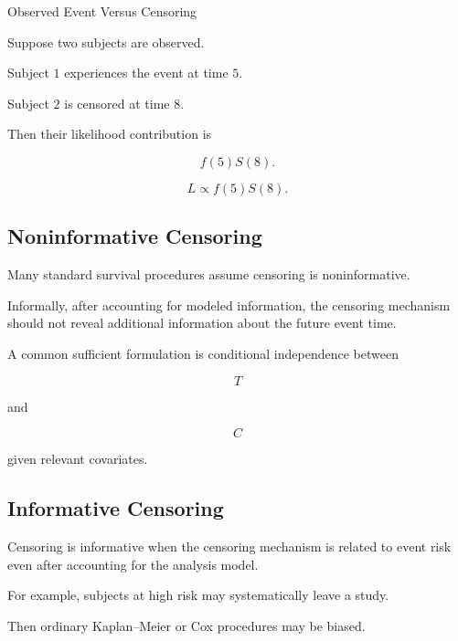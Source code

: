 \begin{workedexamplebox}{Observed Event Versus Censoring}

Suppose two subjects are observed.

Subject \(1\) experiences the event at time \(5\).

Subject \(2\) is censored at time \(8\).

Then their likelihood contribution is

\[
f(5)S(8).
\]

\begin{answerbox}
\[
\boxed{
L
\propto
f(5)S(8).
}
\]
\end{answerbox}

\end{workedexamplebox}

\subsection{Noninformative Censoring}
\label{subsec:noninformative-censoring}

Many standard survival procedures assume censoring is noninformative.

Informally, after accounting for modeled information, the censoring
mechanism should not reveal additional information about the future event
time.

A common sufficient formulation is conditional independence between

\[
T
\]

and

\[
C
\]

given relevant covariates.

\subsection{Informative Censoring}
\label{subsec:informative-censoring}

Censoring is informative when the censoring mechanism is related to event
risk even after accounting for the analysis model.

For example, subjects at high risk may systematically leave a study.

Then ordinary Kaplan--Meier or Cox procedures may be biased.

